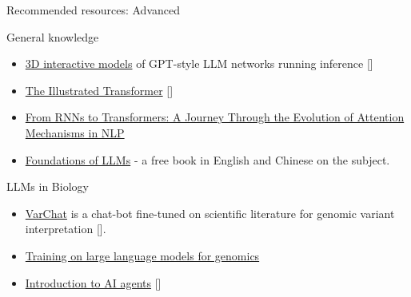 \documentclass[10pt]{beamer}
\newcommand{\citeme}[1]{{\xspace\color{scAqua} \scriptsize [\cite{#1}]}}
\begin{document}
\begin{frame}{Recommended resources: Advanced}
	\begin{block}{General knowledge}
		\begin{itemize}
			\item \href{https://bbycroft.net/llm}{3D interactive models} of GPT-style LLM networks running inference\citeme{Bycroft2023}
			\item \href{http://jalammar.github.io/illustrated-transformer/}{The Illustrated Transformer}\citeme{Alammar2018}
		     \item  \href{https://medium.com/@yacinebouaouni07/from-rnns-to-transformers-a-journey-through-the-evolution-of-attention-mechanisms-in-nlp-ef937e2c8d05}{From RNNs to Transformers: A Journey Through the Evolution of Attention Mechanisms in NLP}
		     \item \href{https://github.com/ZJU-LLMs/Foundations-of-LLMs/blob/main/Foundations_of_LLMs(English_version)/Foundation_of_LLMs.pdf}{Foundations of LLMs} - a free book in English and Chinese on the subject.
		\end{itemize}
	\end{block}
	\begin{block}{LLMs in Biology}
	\begin{itemize}
			\item \href{https://varchat.engenome.com/}{VarChat} is a chat-bot fine-tuned on scientific literature for genomic variant interpretation\citeme{DePaoli2024}.
		\item \href{https://github.com/raphaelmourad/LLM-for-genomics-training}{Training on large language models for genomics}
		\item \href{https://huggingface.co/learn/agents-course/en/unit1/introduction}{Introduction to AI agents}\citeme{Mehandru2025}
	\end{itemize}
\end{block}
\end{frame}
\end{document}
